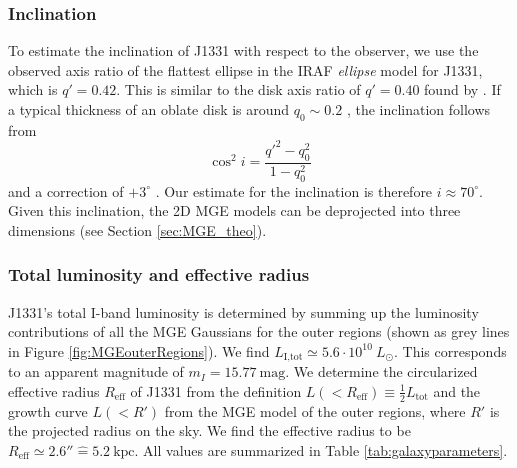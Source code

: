 \documentclass[useAMS,usenatbib]{mnras}
\begin{document}
\subsubsection{Inclination}

To estimate the inclination of J1331 with respect to the observer, we use the observed axis ratio of the flattest ellipse in the IRAF \emph{ellipse} model for J1331, which is $q'=0.42$. This is similar to the disk axis ratio of $q' = 0.40$ found by \citet{SWELLSI}. If a typical thickness of an oblate disk is around $q_0 \sim 0.2$ \citep{1958MeLu2.136....1H}, the inclination follows from 
\begin{equation*}
\cos^2 i = \frac{q'^2 - q_0^2}{1 - q_0^2}
\end{equation*}
and a correction of $+3^\circ$ \citep{1988ngc..book.....T}. Our estimate for the inclination is therefore $i \approx 70^\circ$. Given this inclination, the 2D MGE models can be deprojected into three dimensions (see Section \ref{sec:MGE_theo}).

\subsubsection{Total luminosity and effective radius}

J1331's total I-band luminosity is determined by summing up the luminosity contributions of all the MGE Gaussians for the outer regions (shown as grey lines in Figure \ref{fig:MGEouterRegions}). We find $L_\text{I,tot} \simeq 5.6 \cdot 10^{10} ~L_\odot$. This corresponds to an apparent magnitude of $m_I = 15.77~\text{mag}$. We determine the circularized effective radius $R_\text{eff}$ of J1331 from the definition $L(<R_\text{eff}) \equiv \frac 12 L_\text{tot}$ and the growth curve $L(<R')$ from the MGE model of the outer regions, where $R'$ is the projected radius on the sky. We find the effective radius to be $R_\text{eff} \simeq 2.6'' \hat{=} 5.2~\text{kpc}$.  All values are summarized in Table \ref{tab:galaxyparameters}.
\end{document}
